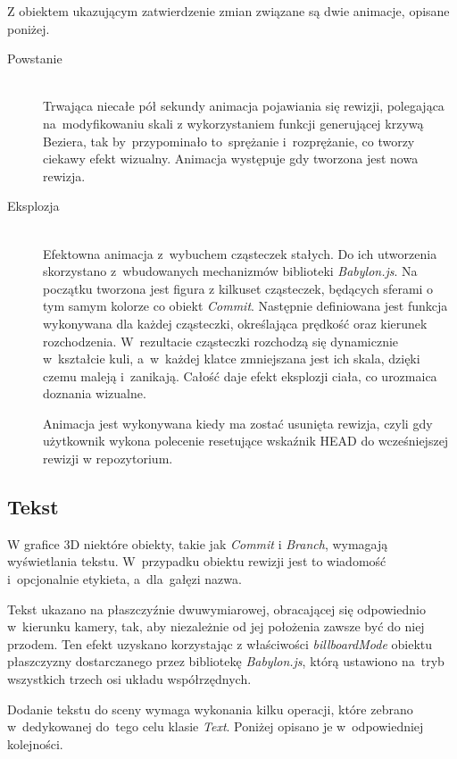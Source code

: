 \documentclass[12pt,a4paper,polish,thesis]{dcsbook}
\begin{document}
{	Z obiektem ukazującym zatwierdzenie zmian związane są dwie animacje, opisane poniżej.
	\begin{description}
		\item[Powstanie] \hfill \\
		Trwająca niecałe pół sekundy animacja pojawiania się rewizji, polegająca na~modyfikowaniu skali z wykorzystaniem funkcji generującej krzywą Beziera, tak by~przypominało to~sprężanie i~rozprężanie, co tworzy ciekawy efekt wizualny. Animacja występuje gdy tworzona jest nowa rewizja.

		\item[Eksplozja] \hfill \\
		Efektowna animacja z~wybuchem cząsteczek stałych. Do ich utworzenia skorzystano z~wbudowanych mechanizmów biblioteki \textit{Babylon.js}. Na początku tworzona jest figura z kilkuset cząsteczek, będących sferami o tym samym kolorze co obiekt \textit{Commit}. Następnie definiowana jest funkcja wykonywana dla każdej cząsteczki, określająca prędkość oraz kierunek rozchodzenia. W~rezultacie cząsteczki rozchodzą się dynamicznie w~kształcie kuli, a~w~każdej klatce zmniejszana jest ich skala, dzięki czemu maleją i~zanikają. Całość daje efekt eksplozji ciała, co urozmaica doznania wizualne.

		Animacja jest wykonywana kiedy ma zostać usunięta rewizja, czyli gdy użytkownik wykona polecenie resetujące wskaźnik HEAD do wcześniejszej rewizji w repozytorium.

	\end{description}

	\subsection{Tekst}
	W grafice 3D niektóre obiekty, takie jak \textit{Commit} i \textit{Branch}, wymagają wyświetlania tekstu. W~przypadku obiektu rewizji jest to wiadomość i~opcjonalnie etykieta, a~dla~gałęzi nazwa.

	Tekst ukazano na płaszczyźnie dwuwymiarowej, obracającej się odpowiednio w~kierunku kamery, tak, aby niezależnie od jej położenia zawsze być do niej przodem. Ten efekt uzyskano korzystając z właściwości \textit{billboardMode} obiektu płaszczyzny dostarczanego przez bibliotekę \textit{Babylon.js}, którą ustawiono na~tryb wszystkich trzech osi układu współrzędnych.

	Dodanie tekstu do sceny wymaga wykonania kilku operacji, które zebrano w~dedykowanej do~tego celu klasie \textit{Text}. Poniżej opisano je w~odpowiedniej kolejności.

}
\end{document}
